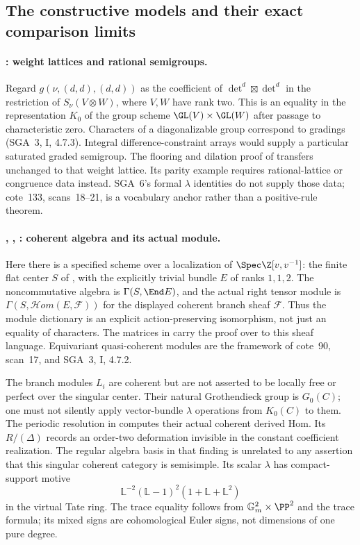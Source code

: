 \subsection{The constructive models and their exact comparison limits}
\paragraph{: weight lattices and rational semigroups.}
Regard $g(\nu,(d,d),(d,d))$ as the coefficient of
$\det^d\boxtimes\det^d$ in the restriction of $S_\nu(V\otimes W)$,
where $V,W$ have rank two. This is an equality in the representation
$K_0$ of the group scheme $\GL(V)\times\GL(W)$ after passage to
characteristic zero. Characters of a diagonalizable group correspond
to gradings (SGA~3, I, 4.7.3). Integral difference-constraint arrays
would supply a particular saturated graded semigroup. The flooring
and dilation proof of  transfers unchanged to that weight
lattice. Its parity example requires rational-lattice or congruence
data instead. SGA~6's formal $\lambda$ identities do not supply those
data; cote~133, scans~18--21, is a vocabulary anchor rather than a
positive-rule theorem.

\paragraph{, , : coherent algebra and its actual module.}
Here there is a specified scheme over a localization of
$\Spec\Z[v,v^{-1}]$: the finite flat center $S$ of , with
the explicitly trivial bundle $E$ of ranks $1,1,2$.
The noncommutative algebra is $\Gamma(S,\End E)$, and the actual
right tensor module is $\Gamma(S,\mathcal Hom(E,\mathcal F))$ for
the displayed coherent branch sheaf $\mathcal F$. Thus the module
dictionary is an explicit action-preserving isomorphism, not just
an equality of characters. The matrices in  carry the proof
over to this sheaf language. Equivariant quasi-coherent modules are
the framework of cote~90, scan~17, and SGA~3, I, 4.7.2.

The branch modules $L_i$ are coherent but are not asserted to be
locally free or perfect over the singular center. Their natural
Grothendieck group is $G_0(C)$; one must not silently apply vector-bundle
$\lambda$ operations from $K_0(C)$ to them. The periodic resolution
in  computes their actual coherent derived Hom. Its
$R/(\Delta)$ records an order-two deformation invisible in the
constant coefficient realization. The regular algebra basis in that
finding is unrelated to any assertion that this singular coherent
category is semisimple. Its scalar $\lambda$ has compact-support motive
\[
 \mathbb L^{-2}(\mathbb L-1)^2(1+\mathbb L+\mathbb L^2)
\]
in the virtual Tate ring. The trace equality follows from
$\mathbb G_m^2\times\PP^2$ and the trace formula; its mixed signs are
cohomological Euler signs, not dimensions of one pure degree.


